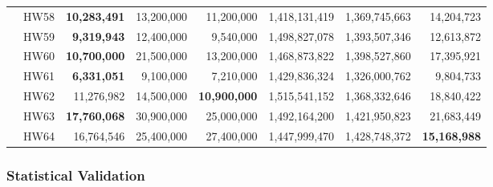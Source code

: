 \documentclass[preprint,12pt]{elsarticle}
\begin{document}
\begin{table}[htp]
{\begin{tabular}{l|r|r|r|r|r|r|r}
 & HW58 & \textbf{10,283,491} & 13,200,000 & 11,200,000 & 1,418,131,419 & 1,369,745,663 & {14,204,723} \\ 
    & HW59 & \textbf{9,319,943} & 12,400,000 & {9,540,000} & 1,498,827,078 & 1,393,507,346 & 12,613,872 \\ 
     & HW60 & \textbf{10,700,000} & 21,500,000 & 13,200,000 & 1,468,873,822 & 1,398,527,860 & {17,395,921} \\ 
     & HW61 & \textbf{6,331,051} & 9,100,000 & 7,210,000 & 1,429,836,324 & 1,326,000,762 & 9,804,733 \\ 
    & HW62 & 11,276,982 & 14,500,000 & \textbf{10,900,000} & 1,515,541,152 & 1,368,332,646 & {18,840,422} \\ 
 & HW63 & \textbf{17,760,068} & 30,900,000 & 25,000,000 & 1,492,164,200 & 1,421,950,823 & {21,683,449} \\ 
    & HW64 & {16,764,546} & 25,400,000 & 27,400,000 & 1,447,999,470 & 1,428,748,372 & \textbf{15,168,988} \\ 
    \hline
    \end{tabular}}
\end{table}

\subsubsection{Statistical Validation}


\end{document}
